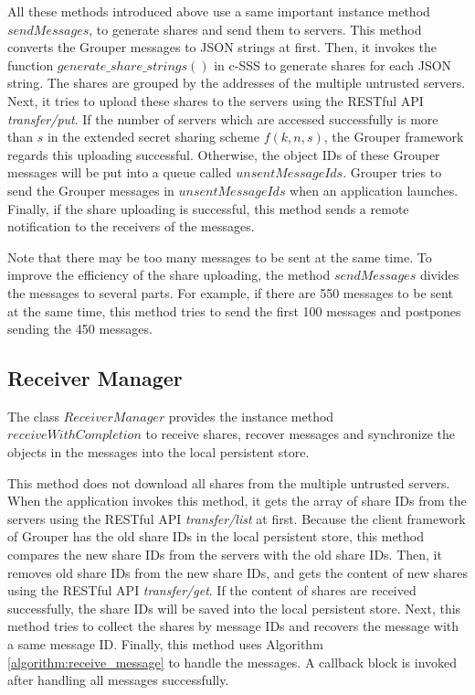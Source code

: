 \documentclass[a4paper,11pt]{report}
\begin{document}
All these methods introduced above use a same important instance method $sendMessages$, to generate shares and send them to servers.
This method converts the Grouper messages to JSON strings at first.
Then, it invokes the function $generate\_share\_strings()$ in c-SSS\cite{c-sss} to generate shares for each JSON string.
The shares are grouped by the addresses of the multiple untrusted servers.
Next, it tries to upload these shares to the servers using the RESTful API \emph{transfer/put}.
If the number of servers which are accessed successfully is more than $s$ in the extended secret sharing scheme $f(k, n, s)$, the Grouper framework regards this uploading successful.
Otherwise, the object IDs of these Grouper messages will be put into a queue called $unsentMessageIds$.
Grouper tries to send the Grouper messages in $unsentMessageIds$ when an application launches.
Finally, if the share uploading is successful, this method sends a remote notification to the receivers of the messages.

Note that there may be too many messages to be sent at the same time.
To improve the efficiency of the share uploading, the method $sendMessages$ divides the messages to several parts.
For example, if there are 550 messages to be sent at the same time, this method tries to send the first 100 messages and postpones sending the 450 messages.

\subsection{Receiver Manager}

The class $ReceiverManager$ provides the instance method $receiveWithCompletion$ to receive shares, recover messages and synchronize the objects in the messages into the local persistent store.

This method does not download all shares from the multiple untrusted servers.
When the application invokes this method, it gets the array of share IDs from the servers using the RESTful API \emph{transfer/list} at first.
Because the client framework of Grouper has the old share IDs in the local persistent store, this method compares the new  share IDs from the servers with the old share IDs.
Then, it removes old share IDs from the new share IDs, and gets the content of new shares using the RESTful API \emph{transfer/get}.
If the content of shares are received successfully, the share IDs will be saved into the local persistent store.
Next, this method tries to collect the shares by message IDs and recovers the message with a same message ID.
Finally, this method uses Algorithm \ref{algorithm:receive_message} to handle the
messages.
A callback block is invoked after handling all messages successfully.
\end{document}
